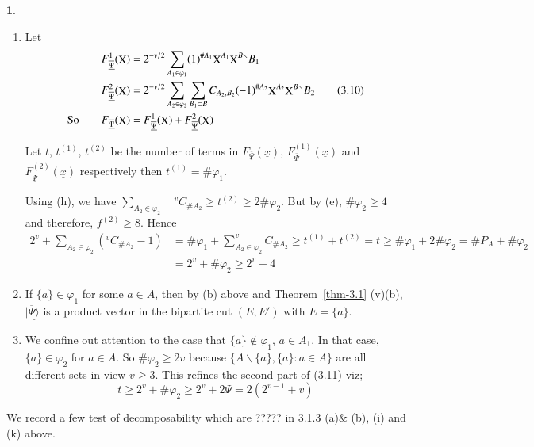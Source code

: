 \documentclass[a4paper,12pt]{article}
\DeclareMathOperator{\x}{\mathrm{X}}
\theoremstyle{definition}
\theoremstyle{underlinethm}
\theoremstyle{definition}
\newtheorem{subsubsec}{}[subsection]
\begin{document}
\begin{subsubsec}
\begin{enumerate}[label=(\alph*)]
\item Let 
\begin{align*}
F^{1}_{\underline{\overline{\Psi}}}(\bold{\x})  &= 2^{-v/2} \sum_{A_{1} \in \varphi_{1}}(1)^{\# A_{1}} \bold{\x}^{A_{1}} \bold{\x}^{B\smallsetminus} B_{1}\\
F^{2}_{\underline{\overline{\Psi}}}(\bold{\x})  &= 2^{-v/2} \sum_{A_{2} \in \varphi_{2}} \sum_{B_{1} \subset B} C_{A_{2}, B_{2}}(-1)^{\# A_{2}} \bold{\x}^{A_{2}} \bold{\x}^{B\smallsetminus}B_{2}\tag{3.10}\label{eq-3.10}\\
\text{So}\quad\quad F_{\underline{\overline{\Psi}}} (\bold{\x}) &= F^{1}_{\underline{\overline{\Psi}}} (\bold{\x}) + F^{2}_{\underline{\overline{\Psi}}} (\bold{\x})
\end{align*}

Let $t$, $t^{(1)}$, $t^{(2)}$ be the number of terms in $F_{\underline{\overline{\Psi}}}(\underline{x})$, $F^{(1)}_{\underline{\overline{\Psi}}}(\underline{x})$ and $F^{(2)}_{\underline{\overline{\Psi}}}(\underline{x})$ respectively then $t^{(1)} = \# \varphi_{1}$.

Using (h), we have $\sum_{A_{2} \in \varphi_{2}} \quad ^{v}C_{\# A_{2}} \geq t^{(2)} \geq 2 \# \varphi_{2}$. But by (e), $\# \varphi_{2} \geq 4$  and therefore, $f^{(2)} \geq 8$. Hence 
\begin{align*}
2^ {v} + \sum_{A_{2} \in \varphi_{2}}(^{v}C_{\# A_{2}}-1) &= \# \varphi_{1} + \sum_{A_{2} \in \varphi_{2}} ^{v}C_{\# A_{2}} \geq t^{(1)} + t^{(2)} = t \geq \# \varphi_{1} + 2 \# \varphi_{2} = \#P_{A} + \# \varphi_{2}\\
& = 2^{v} + \# \varphi_{2} \geq 2^{v} + 4 \tag{3.11}  
\end{align*}

\item If $\{a\} \in \varphi_{1}$ for some $a\in A$, then by (b) above and Theorem~\ref{thm-3.1} (v)(b), $|\underline{\overline{\Psi} \rangle}$ is a product vector in the bipartite cut $(E, E')$ with $E= \{a\}$.

\item We confine out attention to the case that $\{a\} \notin \varphi_{1}$, $a\in A_{1}$. In that case, $\{a\} \in \varphi_{2}$ for $a\in A$. So $\# \varphi_{2} \geq 2v$ because $\{A \smallsetminus \{a\}, \{a\} : a \in A \}$ are all different sets in view $v \geq 3$. This refines the second part of (3.11) viz; 
\begin{equation*}
t \geq 2^{v} + \# \varphi_{2} \geq 2^{v} + 2 \Psi = 2(2^{v-1} + v)\tag{3.12} 
\end{equation*} 

\end{enumerate}

We record a few test of decomposability which are ????? in 3.1.3 (a)\& (b), (i) and (k) above.

\end{subsubsec}
\end{document}
